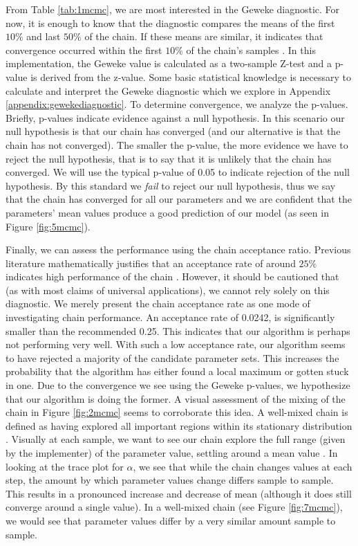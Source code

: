 From Table \ref{tab:1mcmc}, we are most interested in the Geweke diagnostic. For now, it is enough to know that the diagnostic compares the means of the first $10\%$ and last $50\%$ of the chain. If these means are similar, it indicates that convergence occurred within the first $10\%$ of the chain's samples \cite{geweke_ppt} \cite{geweke1}. In this implementation, the Geweke value is calculated as a two-sample Z-test and a p-value is derived from the z-value. Some basic statistical knowledge is necessary to calculate and interpret the Geweke diagnostic which we explore in Appendix \ref{appendix:gewekediagnostic}. To determine convergence, we analyze the p-values. Briefly, p-values indicate evidence against a null hypothesis. In this scenario our null hypothesis is that our chain has converged (and our alternative is that the chain has not converged). The smaller the p-value, the more evidence we have to reject the null hypothesis, that is to say that it is unlikely that the chain has converged. We will use the typical p-value of 0.05 to indicate rejection of the null hypothesis. By this standard we \textit{fail} to reject our null hypothesis, thus we say that the chain has converged for all our parameters and we are confident that the parameters' mean values produce a good prediction of our model (as seen in Figure \ref{fig:5mcmc}). 
\par Finally, we can assess the performance using the chain acceptance ratio. Previous literature mathematically justifies that an acceptance rate of around $25\%$ indicates high performance of the chain \cite{convergence} \cite{converge_threshold}. However, it should be cautioned that (as with most claims of universal applications), we cannot rely solely on this diagnostic. We merely present the chain acceptance rate as one mode of investigating chain performance. An acceptance rate of 0.0242, is significantly smaller than the recommended 0.25. This indicates that our algorithm is perhaps not performing very well. With such a low acceptance rate, our algorithm seems to have rejected a majority of the candidate parameter sets. This increases the probability that the algorithm has either found a local maximum or gotten stuck in one. Due to the convergence we see using the Geweke p-values, we hypothesize that our algorithm is doing the former. A visual assessment of the mixing of the chain in Figure \ref{fig:2mcmc} seems to corroborate this idea. A well-mixed chain is defined as having explored all important regions within its stationary distribution \cite{convergence_mixing}. Visually at each sample, we want to see our chain explore the full range (given by the implementer) of the parameter value, settling around a mean value \cite{convergence_ppt}. In looking at the trace plot for $\alpha$, we see that while the chain changes values at each step, the amount by which parameter values change differs sample to sample. This results in a pronounced increase and decrease of mean (although it does still converge around a single value). In a well-mixed chain (see Figure \ref{fig:7mcmc}), we would see that parameter values differ by a very similar amount sample to sample.
